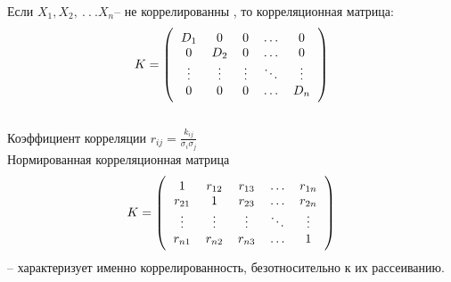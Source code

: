 \documentclass[russian, 12pt, fleqn]{article}
\begin{document}
Если $X_1, X_2, \ .\ .\ . X_n$-- не коррелированны , то корреляционная матрица:\\
$$
K=\left(\begin{tabular}{c c c c c}
\(D_1\) & \(0\) & \(0\) & \(\ldots\) & \(0\) \\
\(0\) &\( D_2\) & \(0\) & \(\ldots\) &\( 0\)\\
\(\vdots\) & \(\vdots\) & \(\vdots\) & \(\ddots\) & \(\vdots\) \\
\(0\)& \(0\) &\(0\) & \(\ldots\) & \(D_n\)\\	
\end{tabular}\right)$$\\
Коэффициент корреляции $r_{ij} = \frac{k_{ij}}{\sigma_i \sigma_j}$\\
Нормированная корреляционная матрица
$$
K=\left(\begin{tabular}{c c c c c}
\(1\) & \(r_{12}\) & \(r_{13}\) & \(\ldots\) & \(r_{1n}\) \\
\(r_{21}\) &\(1\) & \(r_{23}\) & \(\ldots\) &\( r_{2n}\)\\
\(\vdots\) & \(\vdots\) & \(\vdots\) & \(\ddots\) & \(\vdots\) \\
\(r_{n1}\)& \(r_{n2}\) &\( r_{n3}\) & \(\ldots\) & \(1\)\\
\end{tabular}\right)$$
-- характеризует именно коррелированность, безотносительно  к их рассеиванию.



\end{document}
